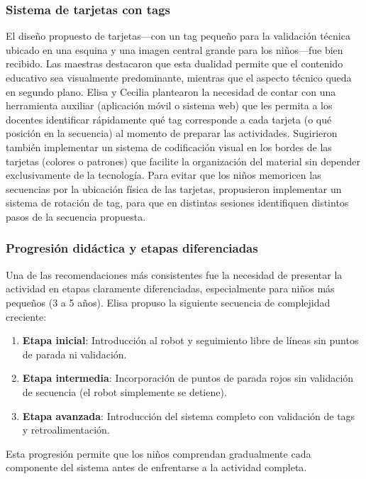 \documentclass{prgrado}
\begin{document}
\subsubsection{Sistema de tarjetas con tags}
El diseño propuesto de tarjetas---con un tag pequeño para la validación técnica ubicado en una esquina y una imagen central grande para los niños---fue bien recibido. Las maestras destacaron que esta dualidad permite que el contenido educativo sea visualmente predominante, mientras que el aspecto técnico queda en segundo plano.
Elisa y Cecilia plantearon la necesidad de contar con una herramienta auxiliar (aplicación móvil o sistema web) que les permita a los docentes identificar rápidamente qué tag corresponde a cada tarjeta (o qué posición en la secuencia) al momento de preparar las actividades. Sugirieron también implementar un sistema de codificación visual en los bordes de las tarjetas (colores o patrones) que facilite la organización del material sin depender exclusivamente de la tecnología.
Para evitar que los niños memoricen las secuencias por la ubicación física de las tarjetas, propusieron implementar un sistema de rotación de tag, para que en distintas sesiones identifiquen distintos pasos de la secuencia propuesta.
\subsubsection{Progresión didáctica y etapas diferenciadas}
Una de las recomendaciones más consistentes fue la necesidad de presentar la actividad en etapas claramente diferenciadas, especialmente para niños más pequeños (3 a 5 años). Elisa propuso la siguiente secuencia de complejidad creciente:
\begin{enumerate}
\item \textbf{Etapa inicial}: Introducción al robot y seguimiento libre de líneas sin puntos de parada ni validación.
\item \textbf{Etapa intermedia}: Incorporación de puntos de parada rojos sin validación de secuencia (el robot simplemente se detiene).
\item \textbf{Etapa avanzada}: Introducción del sistema completo con validación de tags y retroalimentación.
\end{enumerate}
Esta progresión permite que los niños comprendan gradualmente cada componente del sistema antes de enfrentarse a la actividad completa.
\end{document}
